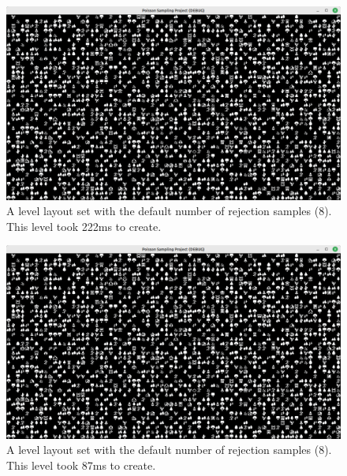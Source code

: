 \begin{figure}[H]
    \centering
    \includegraphics{Images/default-poisson-result.png}
    \caption{A level layout set with the default number of rejection samples (8). This level took 222ms to create.}
    \label{fig:poisson1}
\end{figure}

\begin{figure}[H]
    \centering
    \includegraphics{Images/default-poisson-result.png}
    \caption{A level layout set with the default number of rejection samples (8). This level took 87ms to create.}
    \label{fig:poisson2}
\end{figure}